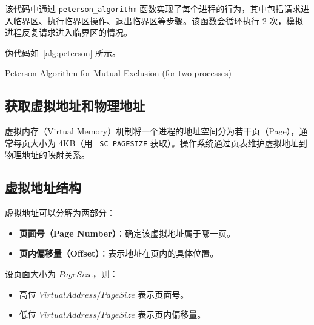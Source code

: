 该代码中通过 \texttt{peterson\_algorithm} 函数实现了每个进程的行为，其中包括请求进入临界区、执行临界区操作、退出临界区等步骤。该函数会循环执行 2 次，模拟进程反复请求进入临界区的情况。

伪代码如~\autoref{alg:peterson} 所示。

\begin{algorithm}[htbp]
\caption{Peterson Algorithm for Mutual Exclusion (for two processes)}
\label{alg:peterson}
\end{algorithm}

\subsection{获取虚拟地址和物理地址}
虚拟内存（Virtual Memory）机制将一个进程的地址空间分为若干页（Page），通常每页大小为 4KB（用 \texttt{\_SC\_PAGESIZE} 获取）。操作系统通过页表维护虚拟地址到物理地址的映射关系。

\subsection{虚拟地址结构}
虚拟地址可以分解为两部分：
\begin{itemize}
    \item \textbf{页面号（Page Number）}：确定该虚拟地址属于哪一页。
    \item \textbf{页内偏移量（Offset）}：表示地址在页内的具体位置。
\end{itemize}

设页面大小为 $ Page Size$，则：
\begin{itemize}
    \item 高位 $Virtual Address / Page Size$ 表示页面号。
    \item 低位 $Virtual Address / Page Size$ 表示页内偏移量。
\end{itemize}

